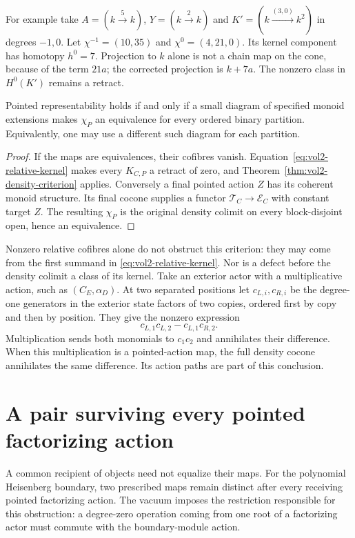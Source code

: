 For example take $A=(k\xrightarrow{5}k)$,
$Y=(k\xrightarrow{2}k)$ and
$K'=(k\xrightarrow{(3,0)}k^2)$ in degrees $-1,0$.
Let $\chi^{-1}=(10,35)$ and $\chi^0=(4,21,0)$.
Its kernel component has homotopy $h^0=7$.
Projection to $k$ alone is not a chain map on the cone,
because of the term $21a$; the corrected projection is
$k+7a$. The nonzero class in $H^0(K')$ remains a retract.

\begin{corollary}\label{cor:vol2-extension-density}
Pointed representability holds if and only if a small
diagram of specified monoid extensions makes $\chi_P$
an equivalence for every ordered binary partition.
Equivalently, one may use a different such diagram for
each partition.
\end{corollary}
\begin{proof}
If the maps are equivalences, their cofibres vanish.
Equation~\eqref{eq:vol2-relative-kernel} makes every
$K_{C,P}$ a retract of zero, and
Theorem~\ref{thm:vol2-density-criterion} applies.
Conversely a final pointed action $Z$ has its coherent
monoid structure. Its final cocone supplies a functor
$\mathscr T_C\to\mathscr E_C$ with constant target $Z$.
The resulting $\chi_P$ is the original density colimit
on every block-disjoint open, hence an equivalence.
\end{proof}

Nonzero relative cofibres alone do not obstruct this
criterion: they may come from the first summand in
\eqref{eq:vol2-relative-kernel}. Nor is a defect before
the density colimit a class of its kernel. Take an exterior
actor with a multiplicative action, such as $(C_E,\alpha_D)$.
At two separated positions let $c_{L,i},c_{R,i}$ be the
degree-one generators in the exterior state factors of
two copies, ordered first by copy and then by position.
They give the nonzero expression
\[
 c_{L,1}c_{L,2}-c_{L,1}c_{R,2}.
\]
Multiplication sends both monomials to $c_1c_2$ and
annihilates their difference. When this multiplication
is a pointed-action map, the full density cocone
annihilates the same difference. Its action paths are
part of this conclusion.

\section{A pair surviving every pointed factorizing action}
\label{sec:vol2-pointed-sphere}

A common recipient of objects need not equalize their maps.
For the polynomial Heisenberg boundary, two prescribed maps remain
distinct after every receiving pointed factorizing action.
The vacuum imposes the restriction responsible for this obstruction:
a degree-zero operation coming from one root of a factorizing actor
must commute with the boundary-module action.

